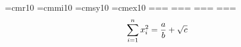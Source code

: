 \font\tenrm=cmr10 \font\teni=cmmi10 \font\tensy=cmsy10 \font\tenex=cmex10
=\tenrm {}=\tenrm {}=\tenrm
{}=\teni {}=\teni {}=\teni
{}=\tensy {}=\tensy {}=\tensy
{}=\tenex {}=\tenex {}=\tenex
$$\sum_{i=1}^n x_i^2 = {a \over b} + \sqrt{c}$$
\bye
